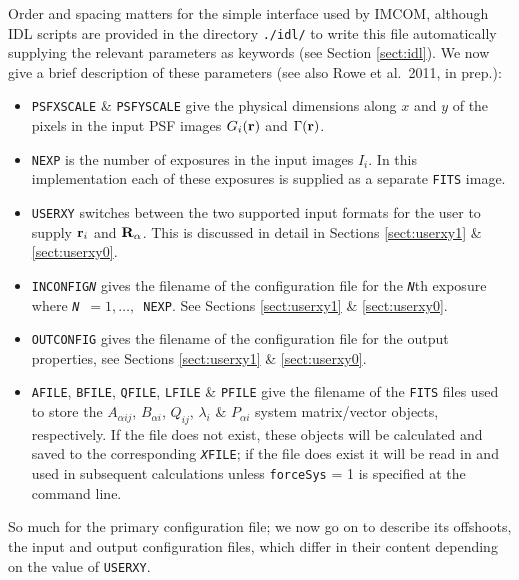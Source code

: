 \documentclass[10pt]{article}
\begin{document}
Order and spacing matters for the simple interface used by IMCOM, although IDL scripts are provided in the directory \texttt{./idl/} to write this file automatically supplying the relevant parameters as keywords (see Section \ref{sect:idl}).
We now give a brief description of these parameters (see also Rowe et al.\ 2011, in prep.):
\begin{itemize}
\item \texttt{PSFXSCALE} \& \texttt{PSFYSCALE} give the physical dimensions along $x$ and $y$ of the pixels in the input PSF images $G_i({\bf r})$ and $\Gamma({\bf r})$.

\item \texttt{NEXP} is the number of exposures in the input images $I_i$.  In this implementation each of these exposures is supplied as a separate \texttt{FITS} image.

\item \texttt{USERXY} switches between the two supported input formats for the user to supply ${\bf r}_i$ and ${\bf R}_{\alpha}$. This is discussed in detail in Sections \ref{sect:userxy1} \& \ref{sect:userxy0}.

\item \texttt{INCONFIG\emph{N}} gives the filename of the configuration file for the \texttt{\emph{N}}th exposure where \texttt{\emph{N}}~$= 1,\ldots,$~\texttt{NEXP}.  See Sections \ref{sect:userxy1} \& \ref{sect:userxy0}.

\item \texttt{OUTCONFIG} gives the filename of the configuration file for the output properties, see Sections \ref{sect:userxy1} \& \ref{sect:userxy0}.

\item \texttt{AFILE}, \texttt{BFILE}, \texttt{QFILE}, \texttt{LFILE} \& \texttt{PFILE} give the filename of the \texttt{FITS} files used to store the $A_{\alpha i j}$, $B_{\alpha i}$, $Q_{i j}$, $\lambda_i$ \& $P_{\alpha i}$ system matrix/vector objects, respectively.  If the file does not exist, these objects will be calculated and saved to the corresponding \texttt{\emph{X}FILE}; if the file does exist it will be read in and used in subsequent calculations unless \texttt{forceSys} = 1 is specified at the command line.
\end{itemize}

So much for the primary configuration file; we now go on to describe its offshoots, the input and output configuration files, which differ in their content depending on the value of \texttt{USERXY}.
\end{document}
